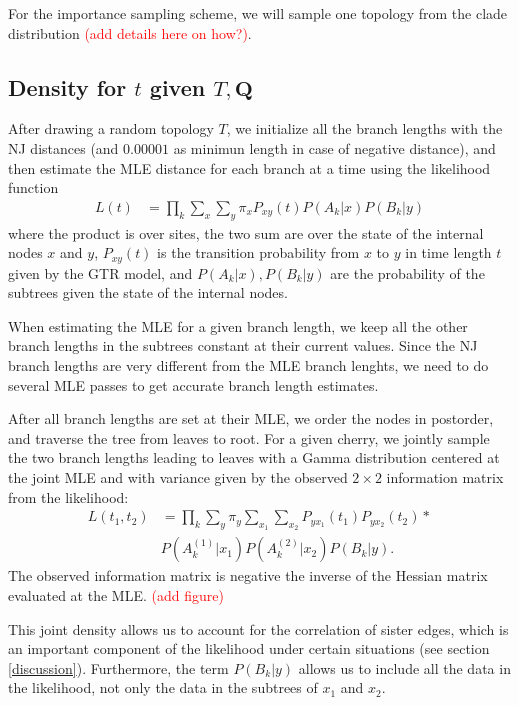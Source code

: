 \documentclass[conference]{IEEEtran}
\newcommand{\falta}[1]{\textcolor{red}{#1}}
\begin{document}
For the importance sampling scheme, we will sample one topology from
the clade distribution \falta{(add details here on how?)}.


\subsection*{Density for $t$ given $T,\mathbf{Q}$}
After drawing a random topology $T$, we initialize all the branch
lengths with the NJ distances (and $0.00001$ as minimun length in case
of negative distance), and then estimate the MLE distance for each
branch at a time using the likelihood function
\begin{align*}
L(t) &= \prod_k \sum_x \sum_y \pi_x P_{xy}(t)P(A_k|x)P(B_k|y)
\end{align*}
where the product is over sites, the two sum are over the state of the
internal nodes $x$ and $y$, $P_{xy}(t)$ is the transition probability
from $x$ to $y$ in time length $t$ given by the GTR model, and
$P(A_k|x), P(B_k|y)$ are the probability of the subtrees given the
state of the internal nodes.

When estimating the MLE for a given branch length, we keep all the
other branch lengths in the subtrees constant at their current
values. Since the NJ branch lengths are very different from the MLE
branch lenghts, we need to do several MLE passes to get accurate
branch length estimates.

After all branch lengths are set at their MLE, we order the nodes in
postorder, and traverse the tree from leaves to root. For a given
cherry, we jointly sample the two branch lengths leading to leaves
with a Gamma distribution centered at the joint MLE and with variance
given by the observed $2 \times 2$ information matrix from the
likelihood:
\begin{align*}
L(t_1,t_2) &= \prod_k \sum_y \pi_y \sum_{x_1} \sum_{x_2}
P_{yx_1}(t_1)P_{yx_2}(t_2) * \\
&P(A^{(1)}_k|x_1)P(A^{(2)}_k|x_2)P(B_k|y).
\end{align*}
The observed information matrix is negative the inverse of the Hessian
matrix evaluated at the MLE.
\falta{(add figure)}

This joint density allows us to account for the correlation of
sister edges, which is an important component of the likelihood under
certain situations (see section \ref{discussion}). Furthermore, the
term $P(B_k|y)$ allows us to include all the data in the likelihood,
not only the data in the subtrees of $x_1$ and $x_2$.
\end{document}
